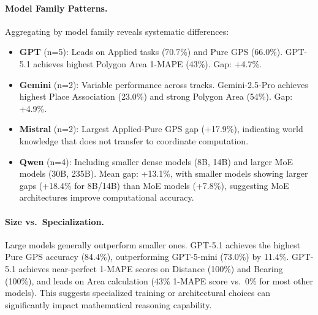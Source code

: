 \paragraph{Model Family Patterns.}
Aggregating by model family reveals systematic differences:
\begin{itemize}[leftmargin=*, itemsep=2pt]
    \item \textbf{GPT} (n=5): Leads on Applied tasks (70.7\%) and Pure GPS (66.0\%). GPT-5.1 achieves highest Polygon Area 1-MAPE (43\%). Gap: +4.7\%.
    \item \textbf{Gemini} (n=2): Variable performance across tracks. Gemini-2.5-Pro achieves highest Place Association (23.0\%) and strong Polygon Area (54\%). Gap: +4.9\%.
    \item \textbf{Mistral} (n=2): Largest Applied-Pure GPS gap (+17.9\%), indicating world knowledge that does not transfer to coordinate computation.
    \item \textbf{Qwen} (n=4): Including smaller dense models (8B, 14B) and larger MoE models (30B, 235B). Mean gap: +13.1\%, with smaller models showing larger gaps (+18.4\% for 8B/14B) than MoE models (+7.8\%), suggesting MoE architectures improve computational accuracy.
\end{itemize}

\paragraph{Size vs.\ Specialization.}
Large models generally outperform smaller ones. GPT-5.1 achieves the highest Pure GPS accuracy (84.4\%), outperforming GPT-5-mini (73.0\%) by 11.4\%. GPT-5.1 achieves near-perfect 1-MAPE scores on Distance (100\%) and Bearing (100\%), and leads on Area calculation (43\% 1-MAPE score vs.\ 0\% for most other models). This suggests specialized training or architectural choices can significantly impact mathematical reasoning capability.


